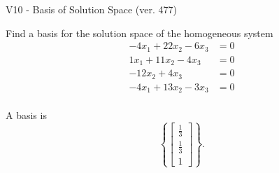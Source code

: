\begin{exercise}
  \begin{exerciseTitle}V10 - Basis of Solution Space (ver. 477)\end{exerciseTitle}
  \begin{exerciseStatement}
    Find a basis for the solution space of the homogeneous system 
\begin{align*}
 -4 x_ 1 + 22 x_ 2 -6 x_ 3 &= 0  \\ 
  1 x_ 1 + 11 x_ 2 -4 x_ 3 &= 0  \\ 
  -12 x_ 2 + 4 x_ 3 &= 0  \\ 
  -4 x_ 1 + 13 x_ 2 -3 x_ 3 &= 0  \\ 
 \end{align*}


 
  \end{exerciseStatement}

  \begin{exerciseAnswer}
   A basis is   
\[\left\{\left[\begin{array}{c}
\frac{1}{3} \\
\frac{1}{3} \\
1
\end{array}\right]\right\}.\]

  


  \end{exerciseAnswer}
\end{exercise}